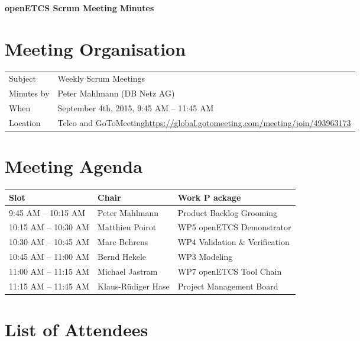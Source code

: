 \documentclass[a4paper, 11pt]{article}
\begin{document}
{\begin{center}\huge\bf openETCS Scrum Meeting Minutes\end{center}}

\section{Meeting Organisation}

\renewcommand{\arraystretch}{1.5}
\begin{supertabular}{m{.2\textwidth}m{.8\textwidth}}
Subject & Weekly Scrum Meetings\\
Minutes by & Peter Mahlmann (DB Netz AG)\\
When & September 4th, 2015, 9:45 AM -- 11:45 AM\\
Location & Telco and GoToMeeting\newline \url{https://global.gotomeeting.com/meeting/join/493963173}\\
\end{supertabular}

\renewcommand{\arraystretch}{1.0}
\section{Meeting Agenda}

\begin{tabular}{lll}
\toprule
\textbf{Slot} &  \textbf{Chair} & \textbf{Work P ackage} \\
\midrule 
9:45 AM -- 10:15 AM & Peter Mahlmann & Product Backlog Grooming  \\
10:15 AM -- 10:30 AM & Matthieu Poirot & WP5 openETCS Demonstrator \\  
10:30 AM -- 10:45 AM & Marc Behrens & WP4 Validation \& Verification \\
10:45 AM -- 11:00 AM & Bernd Hekele & WP3 Modeling \\
11:00 AM -- 11:15 AM & Michael Jastram  & WP7 openETCS Tool Chain \\
11:15 AM -- 11:45 AM & Klaus-R\"udiger Hase & Project Management Board \\
\bottomrule
\end{tabular}

\section{List of Attendees}
\end{document}
